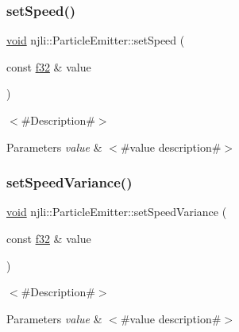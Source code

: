 \subsubsection{\texorpdfstring{set\+Speed()}{setSpeed()}}
{\footnotesize\ttfamily \mbox{\hyperlink{_thread_8h_af1e856da2e658414cb2456cb6f7ebc66}{void}} njli\+::\+Particle\+Emitter\+::set\+Speed (\begin{DoxyParamCaption}\item[{const \mbox{\hyperlink{_util_8h_a5f6906312a689f27d70e9d086649d3fd}{f32}} \&}]{value }\end{DoxyParamCaption})}

$<$\#\+Description\#$>$


\begin{DoxyParams}{Parameters}
{\em value} & $<$\#value description\#$>$ \\
\hline
\end{DoxyParams}
\mbox{\label{classnjli_1_1_particle_emitter_a8a15a3aff8d7f264512e364e3387bc22}} 
\subsubsection{\texorpdfstring{set\+Speed\+Variance()}{setSpeedVariance()}}
{\footnotesize\ttfamily \mbox{\hyperlink{_thread_8h_af1e856da2e658414cb2456cb6f7ebc66}{void}} njli\+::\+Particle\+Emitter\+::set\+Speed\+Variance (\begin{DoxyParamCaption}\item[{const \mbox{\hyperlink{_util_8h_a5f6906312a689f27d70e9d086649d3fd}{f32}} \&}]{value }\end{DoxyParamCaption})}

$<$\#\+Description\#$>$


\begin{DoxyParams}{Parameters}
{\em value} & $<$\#value description\#$>$ \\
\hline
\end{DoxyParams}
\mbox{\label{classnjli_1_1_particle_emitter_a3705b6113fafe520361e0bce816ce11a}} 
